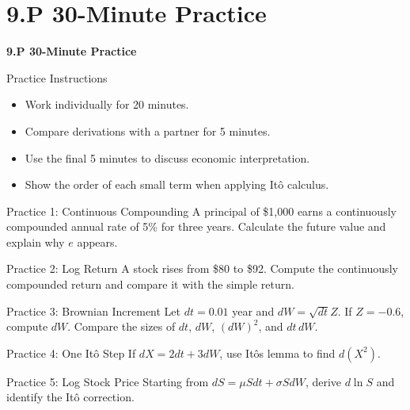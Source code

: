 \documentclass[aspectratio=169]{beamer}
\begin{document}
\section{9.P 30-Minute Practice}
\begin{frame}[plain]
\centering\vfill
{\color{TitleBlue}\Large\bfseries 9.P 30-Minute Practice}\par
\vspace{0.5cm}{\large Foundations, derivation, and interpretation}\par
\vfill\end{frame}

\begin{frame}[t]{Practice Instructions}
\justifying
\begin{itemize}
\item Work individually for 20 minutes.
\item Compare derivations with a partner for 5 minutes.
\item Use the final 5 minutes to discuss economic interpretation.
\item Show the order of each small term when applying It\^o calculus.
\end{itemize}
\end{frame}

\begin{frame}[t]{Practice 1: Continuous Compounding}
\justifying
A principal of \$1,000 earns a continuously compounded annual rate of 5\% for three years. Calculate the future value and explain why $e$ appears.
\end{frame}

\begin{frame}[t]{Practice 2: Log Return}
\justifying
A stock rises from \$80 to \$92. Compute the continuously compounded return and compare it with the simple return.
\end{frame}

\begin{frame}[t]{Practice 3: Brownian Increment}
\justifying
Let $dt=0.01$ year and $dW=\sqrt{dt}Z$. If $Z=-0.6$, compute $dW$. Compare the sizes of $dt$, $dW$, $(dW)^2$, and $dt\,dW$.
\end{frame}

\begin{frame}[t]{Practice 4: One It\^o Step}
\justifying
If $dX=2dt+3dW$, use It\^o\textquotesingle s lemma to find $d(X^2)$.
\end{frame}

\begin{frame}[t]{Practice 5: Log Stock Price}
\justifying
Starting from $dS=\mu Sdt+\sigma SdW$, derive $d\ln S$ and identify the It\^o correction.
\end{frame}
\end{document}
